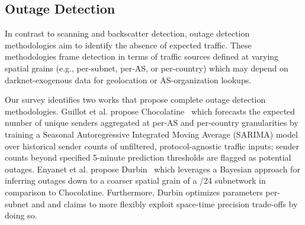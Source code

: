 \documentclass[manuscript,nonacm]{acmart}
\begin{document}
\subsection{Outage Detection}
In contrast to scanning and backscatter detection, outage detection methodologies aim to identify the absence of expected traffic.
These methodologies frame detection in terms of traffic sources defined at varying spatial grains (e.g., per-subnet, per-AS, or per-country) which may depend on darknet-exogenous data for geolocation or AS-organization lookups.

Our survey identifies two works that propose complete outage detection methodologies.
Guillot et al. propose Chocolatine~\cite{2019guillot} which forecasts the expected number of unique senders aggregated at per-AS and per-country granularities by training a Seasonal Autoregressive Integrated Moving Average (SARIMA) model over historical sender counts of unfiltered, protocol-agnostic traffic inputs; 
sender counts beyond specified 5-minute prediction thresholds are flagged as potential outages.
Enyanet et al. propose Durbin~\cite{2024enyanet} which leverages a Bayesian approach for inferring outages down to a coarser spatial grain of a /24 subnetwork in comparison to Chocolatine. Furthermore, Durbin optimizes parameters per-subnet and and claims to more flexibly exploit space-time precision trade-offs by doing so. 
\end{document}
